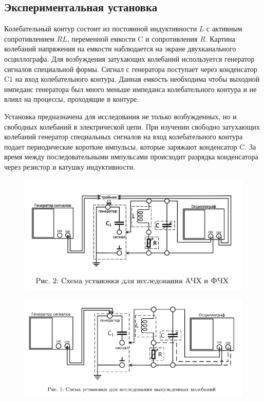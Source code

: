 \documentclass[a4paper,12pt]{article}
\theoremstyle{definition}
\begin{document}
\subsection*{Экспериментальная установка} 
 Колебательный контур состоит из постоянной индуктивности $L$ с активным сопротивлением $RL$, переменной емкости C и сопротивления $R$. Картина колебаний
напряжения на емкости наблюдается на экране двухканального осциллографа. Для возбуждения затухающих колебаний используется генератор сигналов специальной
формы. Сигнал с генератора поступает через конденсатор C1 на вход колебательного контура. Данная емкость необходима чтобы выходной импеданс генератора был
много меньше импеданса колебательного контура и не влиял на процессы, проходящие в контуре. \par
Установка предназначена для исследования не только возбужденных, но и свободных колебаний в электрической цепи. При изучении свободно затухающих колебаний генератор специальных сигналов на вход колебательного контура подает периодические короткие импульсы, которые заряжают конденсатор C. За время между
последовательными импульсами происходит разрядка конденсатора через резистор
и катушку индуктивности. 
\begin{figure}[H]
    \centering
    \includegraphics{2.png}    
\end{figure}
\begin{figure}[H]
    \centering
    \includegraphics{1.png}    
\end{figure}
\end{document}
